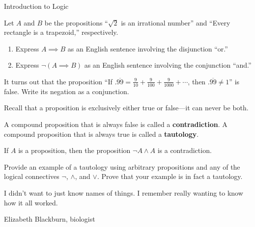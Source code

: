 \begin{section}{Introduction to Logic}
\begin{problem}\label{prob:Darth Vader}
Let $A$ and $B$ be the propositions ``$\sqrt{2}$ is an irrational number'' and ``Every rectangle is a trapezoid,'' respectively.
\begin{enumerate}[label=\textrm{(\alph*)}]
\item Express $A\implies B$ as an English sentence involving the disjunction ``or.''
\item Express $\neg(A\implies B)$ as an English sentence involving the conjunction ``and.''
\end{enumerate}
\end{problem}

\begin{problem}
It turns out that the proposition ``If $.\overline{99}=\frac{9}{10}+\frac{9}{100}+\frac{9}{1000}+\cdots$, then $.\overline{99}\neq 1$'' is false. Write its  negation as a conjunction.
\end{problem}

Recall that a proposition is exclusively either true or false---it can never be both.

\begin{definition}
A compound proposition that is always false is called a \textbf{contradiction}.  A compound proposition that is always true is called a \textbf{tautology}.
\end{definition}

\begin{theorem}
If $A$ is a proposition, then the proposition $\neg A\wedge A$ is a contradiction.
\end{theorem}

\begin{problem}
Provide an example of a tautology using arbitrary propositions and any of the logical connectives $\neg$, $\wedge$, and $\vee$.  Prove that your example is in fact a tautology.
\end{problem}

\epigraph{I didn't want to just know names of things. I remember really wanting to know how it all worked.}{Elizabeth Blackburn, biologist}

\end{section}